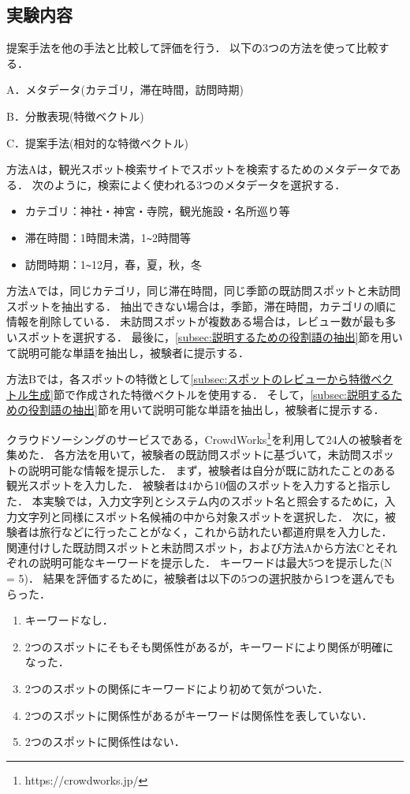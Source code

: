 \documentclass{deimj}
\begin{document}
\subsection{実験内容}
提案手法を他の手法と比較して評価を行う．
以下の3つの方法を使って比較する．
\begin{description}
  \item A．メタデータ(カテゴリ，滞在時間，訪問時期)
  \item B．分散表現(特徴ベクトル)
  \item C．提案手法(相対的な特徴ベクトル)
\end{description}

方法Aは，観光スポット検索サイトでスポットを検索するためのメタデータである．
次のように，検索によく使われる3つのメタデータを選択する．
\begin{itemize}
 \item カテゴリ：神社・神宮・寺院，観光施設・名所巡り等
 \item 滞在時間：1時間未満，1\verb|~|2時間等
 \item 訪問時期：1\verb|~|12月，春，夏，秋，冬
\end{itemize}

方法Aでは，同じカテゴリ，同じ滞在時間，同じ季節の既訪問スポットと未訪問スポットを抽出する．
抽出できない場合は，季節，滞在時間，カテゴリの順に情報を削除している．
未訪問スポットが複数ある場合は，レビュー数が最も多いスポットを選択する．
最後に，\ref{subsec:説明するための役割語の抽出}節を用いて説明可能な単語を抽出し，被験者に提示する．

方法Bでは，各スポットの特徴として\ref{subsec:スポットのレビューから特徴ベクトル生成}節で作成された特徴ベクトルを使用する．
そして，\ref{subsec:説明するための役割語の抽出}節を用いて説明可能な単語を抽出し，被験者に提示する．

クラウドソーシングのサービスである，CrowdWorks\footnote{https://crowdworks.jp/}を利用して24人の被験者を集めた．
各方法を用いて，被験者の既訪問スポットに基づいて，未訪問スポットの説明可能な情報を提示した．
まず，被験者は自分が既に訪れたことのある観光スポットを入力した．
被験者は4から10個のスポットを入力すると指示した．
本実験では，入力文字列とシステム内のスポット名と照会するために，入力文字列と同様にスポット名候補の中から対象スポットを選択した．
次に，被験者は旅行などに行ったことがなく，これから訪れたい都道府県を入力した．
関連付けした既訪問スポットと未訪問スポット，および方法Aから方法Cとそれぞれの説明可能なキーワードを提示した．
キーワードは最大5つを提示した(N = 5)．
結果を評価するために，被験者は以下の5つの選択肢から1つを選んでもらった．
\begin{enumerate}
  \item キーワードなし．
  \item 2つのスポットにそもそも関係性があるが，キーワードにより関係が明確になった．
  \item 2つのスポットの関係にキーワードにより初めて気がついた．
  \item 2つのスポットに関係性があるがキーワードは関係性を表していない．
  \item 2つのスポットに関係性はない．
\end{enumerate}
\end{document}
